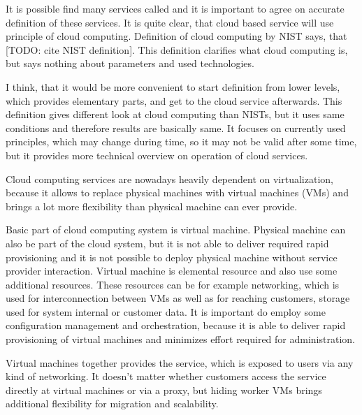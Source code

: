 
It is possible find many services called  and it is important to agree on accurate definition of these services. It is quite clear, that cloud based service will use principle of cloud computing. Definition of cloud computing by \Ac{NIST} says, that  [TODO: cite NIST definition]. This definition clarifies what cloud computing is, but says nothing about parameters and used technologies.

I think, that it would be more convenient to start definition from lower levels, which provides elementary parts, and get to the cloud service afterwards. This definition gives different look at cloud computing than \Ac{NIST}s, but it uses same conditions and therefore results are basically same. It focuses on currently used principles, which may change during time, so it may not be valid after some time, but it provides more technical overview on operation of cloud services.


Cloud computing services are nowadays heavily dependent on virtualization, because it allows to replace physical machines with virtual machines (\Ac{VM}s) and brings a lot more flexibility than physical machine can ever provide.

Basic part of cloud computing system is virtual machine. Physical machine can also be part of the cloud system, but it is not able to deliver required rapid provisioning and it is not possible to deploy physical machine without service provider interaction. Virtual machine is elemental resource and also use some additional resources. These resources can be for example networking, which is used for interconnection between \Ac{VM}s as well as for reaching customers, storage used for system internal or customer data. It is important do employ some configuration management and orchestration, because it is able to deliver rapid provisioning of virtual machines and minimizes effort required for administration.

Virtual machines together provides the service, which is exposed to users via any kind of networking. It doesn't matter whether customers access the service directly at virtual machines or via a proxy, but hiding worker \Ac{VM}s brings additional flexibility for migration and scalability. 

